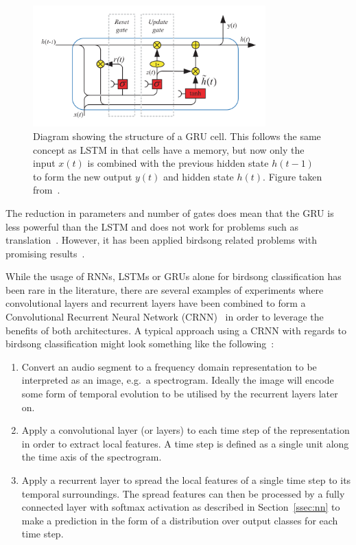 \begin{figure}[ht]
  \centering
  \includegraphics[width=0.8\textwidth]{figures/gru_cell.png}
  \caption{Diagram showing the structure of a GRU cell. This follows the same
    concept as LSTM in that cells have a memory, but now only the input $x(t)$
    is combined with the previous hidden state $h(t-1)$ to form the new output
    $y(t)$ and hidden state $h(t)$. Figure taken
  from~\cite{yu2019review}.}\label{fig:gru_cell}
\end{figure}

The reduction in parameters and number of gates does mean that the GRU is less
powerful than the LSTM and does not work for problems such as
translation~\cite{britz2017massive}. However, it has been applied birdsong
related problems with promising
results~\cite{parrilla2022polyphonic,adavanne2017stacked}.

While the usage of RNNs, LSTMs or GRUs alone for birdsong classification has
been rare in the literature, there are several examples of experiments where
convolutional layers and recurrent layers have been combined to form a
Convolutional Recurrent Neural Network
(CRNN)~\cite{yan2021birdsong,mukherjee2018convolutional} in order to leverage
the benefits of both architectures. A typical approach using a CRNN with regards
to birdsong classification might look something like the
following~\cite{crous2019polyphonic}:

\begin{enumerate}

  \item Convert an audio segment to a frequency domain representation to be
    interpreted as an image, e.g.\ a spectrogram. Ideally the image will encode
    some form of temporal evolution to be utilised by the recurrent layers later
    on.

  \item Apply a convolutional layer (or layers) to each time step of the
    representation in order to extract local features. A time step is defined as
    a single unit along the time axis of the spectrogram.

  \item Apply a recurrent layer to spread the local features of a single time
    step to its temporal surroundings. The spread features can then be processed
    by a fully connected layer with softmax activation as described in
    Section~\ref{ssec:nn} to make a prediction in the form of a distribution
    over output classes for each time step.

\end{enumerate}

